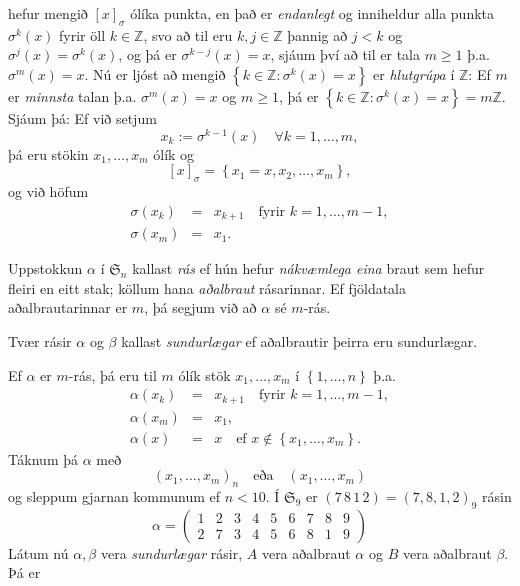 \documentclass[a4paper,icelandic,11pt]{book}
\theoremstyle{plain}
\newcommand{\Z}{\mathbb{Z}}
\begin{document}
hefur mengið $[x]_\sigma$ ólíka punkta, en það er \emph{endanlegt} og inniheldur
alla punkta $\sigma^k(x)$ fyrir öll $k\in\Z$, svo að til eru $k,j\in\Z$ þannig
að $j < k$ og $\sigma^j(x)=\sigma^k(x)$, og þá er $\sigma^{k-j}(x)=x$, sjáum því
að til er tala $m\ge 1$ þ.a. $\sigma^{m}(x) = x$. Nú er ljóst að mengið $\left\{
k\in\Z:\sigma^k(x) = x \right\}$ er \emph{hlutgrúpa} í $\Z$: Ef $m$ er
\emph{minnsta} talan þ.a.  $\sigma^m(x)=x$ og $m\ge 1$, þá er $\left\{
k\in\Z:\sigma^k(x)=x \right\}=m\Z$.  Sjáum þá: Ef við setjum
\[
x_k:=\sigma^{k-1}(x) \quad \forall k=1,\dots,m,
\]
þá eru stökin $x_1,\dots,x_m$ ólík og
\[
[x]_\sigma = \left\{ x_1 = x, x_2,\dots,x_m \right\},
\]
og við höfum
\begin{eqnarray*}
  \sigma(x_k) &=&  x_{k+1} \quad \text{fyrir } k = 1,\dots,m-1, \\
  \sigma(x_m) &=&  x_1.
\end{eqnarray*}
\begin{skilgr}
  Uppstokkun $\alpha$ í $\mathfrak S_n$ kallast
  \emph{rás} ef hún hefur
  \emph{nákvæmlega eina} braut sem hefur fleiri en eitt stak; köllum hana
  \emph{aðalbraut}
  rásarinnar. Ef fjöldatala aðalbrautarinnar er $m$, þá
  segjum við að $\alpha$ sé $m$-rás.

  Tvær rásir $\alpha$ og $\beta$ kallast \emph{sundurlægar} ef aðalbrautir þeirra eru sundurlægar.
\end{skilgr}
Ef $\alpha$ er $m$-rás, þá eru til $m$ ólík stök $x_1,\dots,x_m$ í $\left\{
1,\dots,n
\right\}$ þ.a.
\begin{eqnarray*}
  \alpha(x_k) &=& x_{k+1} \quad \text{fyrir } k = 1,\dots,m-1, \\
  \alpha(x_m) &=& x_1, \\
  \alpha(x)   &=& x \quad \text{ef } x\notin\left\{ x_1,\dots,x_m \right\}.
\end{eqnarray*}
Táknum þá $\alpha$ með\[
\left( x_1,\dots,x_m \right)_n \quad\text{eða}\quad \left( x_1,\dots,x_m \right)
\]
og sleppum gjarnan kommunum ef $n < 10$. Í $\mathfrak S_9$ er $(7\,8\,1\,2) =
(7,8,1,2)_9$ rásin
\[
 \alpha =\begin{pmatrix}
   1 & 2 & 3 & 4 & 5 & 6 & 7 & 8 & 9 \\
   2 & 7 & 3 & 4 & 5 & 6 & 8 & 1 & 9
 \end{pmatrix}
\]
Látum nú $\alpha,\beta$ vera \emph{sundurlægar} rásir, $A$ vera aðalbraut
$\alpha$ og $B$ vera aðalbraut $\beta$. Þá er
\end{document}
